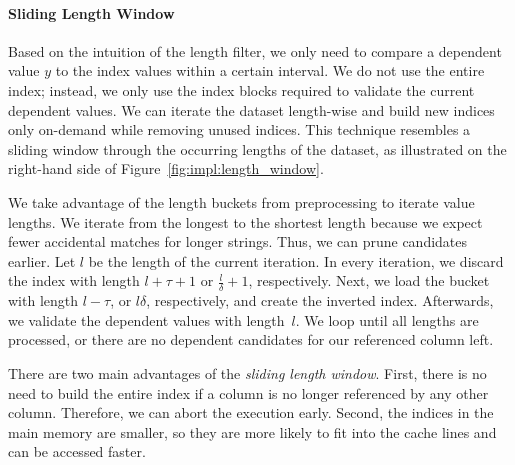\paragraph{Sliding Length Window}
\label{subsection:sind:optimizations:length}
Based on the intuition of the length filter, we only need to compare a dependent value $y$ to the index values within a certain interval. %
We do not use the entire index; instead, we only use the index blocks required to validate the current dependent values.
We can iterate the dataset length-wise and build new indices only on-demand while removing unused indices.
This technique resembles a sliding window through the occurring lengths of the dataset, as illustrated on the right-hand side of Figure~\ref{fig:impl:length_window}.

We take advantage of the length buckets from preprocessing to iterate value lengths.
We iterate from the longest to the shortest length because we expect fewer accidental matches for longer strings.
Thus, we can prune candidates earlier.
Let $l$ be the length of the current iteration.
In every iteration, we discard the index with length $l + \tau + 1$ or $\frac{l}{\delta} + 1$, respectively.
Next, we load the bucket with length $l - \tau$, or $l \delta$, respectively, and create the inverted index.
Afterwards, we validate the dependent values with length~$l$.
We loop until all lengths are processed, or there are no dependent candidates for our referenced column left.

There are two main advantages of the \emph{sliding length window}.
First, there is no need to build the entire index if a column is no longer referenced by any other column.
Therefore, we can abort the execution early.
Second, the indices in the main memory are smaller, so they are more likely to fit into the cache lines and can be accessed faster.

